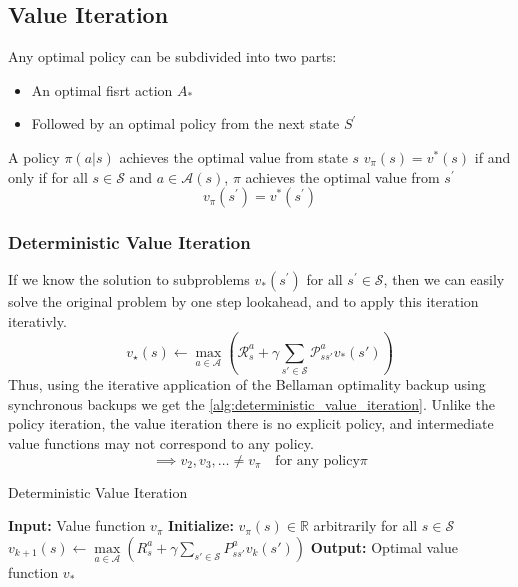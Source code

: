 \subsection{Value Iteration}
Any optimal policy can be subdivided into two parts:
\begin{itemize}
    \item An optimal fisrt action \(A_{*}\)
    \item Followed by an optimal policy from the next state \(S^{\prime} \)
\end{itemize}

\begin{theorem}
    A policy \(\pi(a|s)\) achieves the optimal value from state \(s\) \(v_{\pi}(s) = v^{*}(s)\)
    if and only if for all \(s \in \mathcal{S}\) and \(a \in \mathcal{A}(s)\), \(\pi \) 
    achieves the optimal value from \(s^{\prime}\)
    \[
        v_{\pi}(s^{\prime}) = v^{*}(s^{\prime})
    \]
\end{theorem}

\subsubsection{Deterministic Value Iteration}
If we know the solution to subproblems \(v_{*}(s^{\prime})\) for all \(s^{\prime} \in \mathcal{S}\),
then we can easily solve the original problem by one step lookahead, and to apply this iteration
iterativly.
\[
    v_{\star}(s) \gets \max_{a \in \mathcal{A}} \left(   
    \mathcal{R} _{s}^{a} + \gamma 
    \sum\limits_{s' \in \mathcal{S}} \mathcal{P}_{ss'}^{a} v_{*}(s') \right)
\]
Thus, using the iterative application of the Bellaman optimality backup using synchronous backups
we get the \autoref{alg:deterministic_value_iteration}.
Unlike the policy iteration, the value iteration there is no explicit policy, 
and intermediate value functions may not correspond to any policy.
\[
    \implies v_2, v_3, \dots  \neq v_\pi \quad \text{for any policy} \pi  
\]


\begin{algorithm}[H]
    \caption{Deterministic Value Iteration}
    \label{alg:deterministic_value_iteration}
    \begin{algorithmic}[1]
        \State \textbf{Input:} Value function $v_{\pi}$
        \State \textbf{Initialize:} $v_{\pi}(s) \in \mathbb{R}$ arbitrarily for all $s \in \mathcal{S}$
                \State $v_{k+1}(s) \leftarrow \max\limits_{a \in \mathcal{A}} 
                    \left( 
                        R_{s}^{a} + \gamma \sum\limits_{s' \in \mathcal{S}}
                        P_{ss'}^{a} v_{k}(s')   
                     \right)$
            \EndFor
        \EndWhile
        \State \textbf{Output:} Optimal value function $v_{*}$
    \end{algorithmic}
\end{algorithm}

